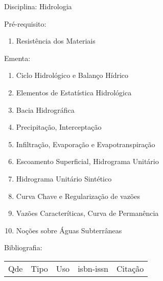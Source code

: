 \documentclass[12pt,a4paper,twoside]{report}
\begin{document}
Disciplina: Hidrologia

Pré-requisito:
\begin{enumerate}
\item Resistência dos Materiais
\end{enumerate}

Ementa:
\begin{enumerate}
\item Ciclo Hidrológico e Balanço Hídrico
\item Elementos de Estatística Hidrológica
\item Bacia Hidrográfica
\item Precipitação, Interceptação
\item Infiltração, Evaporação e Evapotranspiração
\item Escoamento Superficial, Hidrograma Unitário
\item Hidrograma Unitário Sintético
\item Curva Chave e Regularização de vazões
\item Vazões Caracteríticas, Curva de Permanência
\item Noções sobre Águas Subterrâneas
\end{enumerate}

Bibliografia:
\begin{tabular}{lllll}
Qde & Tipo & Uso & isbn-issn & Citação \\
\end{tabular}
\end{document}
